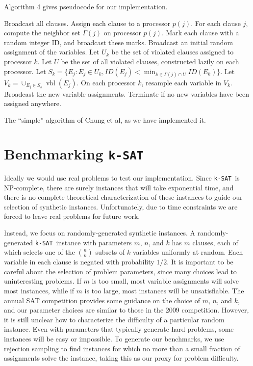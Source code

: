 \documentclass[twocolumn]{article}
\newcommand{\ksat}{\texttt{k-SAT}~}
\begin{document}
Algorithm 4 gives pseudocode for our implementation.

\begin{algorithm}[H]
\label{alg:implementation}
\begin{algorithmic}
\State Broadcast all clauses.
\State Assign each clause to a processor $p(j)$.
\State For each clause $j$, compute the neighbor set $\Gamma(j)$ on processor $p(j)$.
\State Mark each clause with a random integer ID, and broadcast these marks.
\State Broadcast an initial random assignment of the variables.
  \State Let $U_k$ be the set of violated clauses assigned to processor $k$.
  \State Let $U$ be the set of all violated clauses, constructed lazily on each processor.
  \State Let $S_k = \{E_j: E_j \in U_k, ID(E_j) < \min_{k \in \Gamma(j) \cap U} ID(E_k)\}$.
  \State Let $V_k = \cup_{E_j \in S_k} \operatorname{vbl}(E_j)$.
  \State On each processor $k$, resample each variable in $V_k$.
  \State Broadcast the new variable assignments.
  \State Terminate if no new variables have been assigned anywhere.
\EndWhile
\end{algorithmic}
\caption{The ``simple'' algorithm of Chung et al, as we have implemented it.}
\end{algorithm}

\section{Benchmarking \ksat}
\label{sec:benchmarks}
Ideally we would use real problems to test our implementation.  Since \ksat is NP-complete, there are surely instances that will take exponential time, and there is no complete theoretical characterization of these instances to guide our selection of synthetic instances.  Unfortunately, due to time constraints we are forced to leave real problems for future work.

Instead, we focus on randomly-generated synthetic instances.  A randomly-generated \ksat instance with parameters $m$, $n$, and $k$ has $m$ clauses, each of which selects one of the ${n \choose k}$ subsets of $k$ variables uniformly at random.  Each variable in each clause is negated with probability $1/2$.  It is important to be careful about the selection of problem parameters, since many choices lead to uninteresting problems.  If $m$ is too small, most variable assignments will solve most instances, while if $m$ is too large, most instances will be unsatisfiable.  The annual SAT competition \cite{belov2014sat} provides some guidance on the choice of $m$, $n$, and $k$, and our parameter choices are similar to those in the 2009 competition.  However, it is still unclear how to characterize the difficulty of a particular random instance.  Even with parameters that typically generate hard problems, some instances will be easy or impossible.  To generate our benchmarks, we use rejection sampling to find instances for which no more than a small fraction of assignments solve the instance, taking this as our proxy for problem difficulty.
\end{document}
